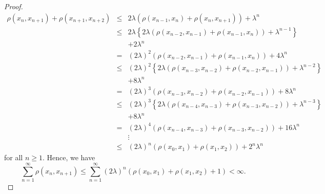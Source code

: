 \documentclass[reqno,11pt]{amsart}
\theoremstyle{plain}
\numberwithin{equation}{section}
\begin{document}
\begin{proof}
\begin{eqnarray*}
\rho (x_{n},x_{n+1})+\rho (x_{n+1},x_{n+2}) &\leq &2\lambda \left( \rho
(x_{n-1},x_{n})+\rho (x_{n},x_{n+1})\right) +\lambda ^{n} \\
&\leq &2\lambda \left \{ 2\lambda \left( \rho (x_{n-2},x_{n-1})+\rho
(x_{n-1},x_{n})\right) +\lambda ^{n-1}\right \} \\
&&+2\lambda ^{n} \\
&=&\left( 2\lambda \right) ^{2}\left( \rho (x_{n-2},x_{n-1})+\rho
(x_{n-1},x_{n})\right) +4\lambda ^{n} \\
&\leq &\left( 2\lambda \right) ^{2}\left \{ 2\lambda \left( \rho
(x_{n-3},x_{n-2})+\rho (x_{n-2},x_{n-1})\right) +\lambda ^{n-2}\right \} \\
&&+8\lambda ^{n} \\
&=&\left( 2\lambda \right) ^{3}\left( \rho (x_{n-3},x_{n-2})+\rho
(x_{n-2},x_{n-1})\right) +8\lambda ^{n} \\
&\leq &\left( 2\lambda \right) ^{3}\left \{ 2\lambda \left( \rho
(x_{n-4},x_{n-3})+\rho (x_{n-3},x_{n-2})\right) +\lambda ^{n-3}\right \} \\
&&+8\lambda ^{n} \\
&=&\left( 2\lambda \right) ^{4}\left( \rho (x_{n-4},x_{n-3})+\rho
(x_{n-3},x_{n-2})\right) +16\lambda ^{n} \\
&&\vdots \\
&\leq &\left( 2\lambda \right) ^{n}\left( \rho (x_{0},x_{1})+\rho
(x_{1},x_{2})\right) +2^{n}\lambda ^{n}
\end{eqnarray*}%
for all $n\geq 1$. Hence, we have 
\begin{equation*}
\sum \limits_{n=1}^{\infty }\rho (x_{n},x_{n+1})\leq \sum
\limits_{n=1}^{\infty }\left( 2\lambda \right) ^{n}\left( \rho
(x_{0},x_{1})+\rho (x_{1},x_{2})+1\right) <\infty .
\end{equation*}


\end{proof}
\end{document}
